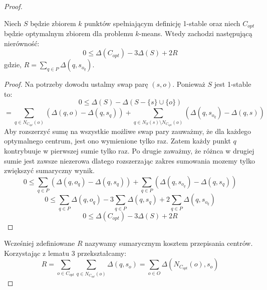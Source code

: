 \begin{proof}
    \begin{lemma}{\cite{10.1145/1007352.1007400}}
        Niech $S$ będzie zbiorem $k$ punktów spełniającym definicję 1-stable oraz niech $C_{opt}$ będzie optymalnym zbiorem dla problemu $k$-means.        Wtedy zachodzi następującą nierówność:
        \begin{equation}
            0 \leq \Delta(C_{opt}) - 3\Delta(S) + 2R
        \end{equation}
        gdzie, $R = \sum_{q \in P} \Delta(q, s_{o_{q}})$.
    \end{lemma}
    \begin{proof}
        Na potrzeby dowodu ustalmy swap parę $(s, o)$.
        Ponieważ $S$ jest 1-stable to:
        \begin{equation}
           0 \leq \Delta(S) -  \Delta(S - \{s\} \cup \{o\})
        \end{equation}
        \begin{equation}
            = \sum_{q \in N_{C_{opt}}(o)} (\Delta(q, o) - \Delta(q, s_{q})) + \sum_{q \in N_{S}(s) \setminus N_{C_{opt}}(o)} (\Delta(q, s_{o_{q}}) - \Delta(q, s))
        \end{equation}
        Aby rozszerzyć sumę na wszystkie możliwe swap pary zauważmy, że dla każdego optymalnego centrum, jest ono wymienione tylko raz.
        Zatem każdy punkt $q$ kontrybuuje w pierwszej sumie tylko raz.
        Po drugie zaważmy, że różnca w drugiej sumie jest zawsze niezerowa dlatego rozszerzając zakres sumowania mozemy tylko zwiększyć sumaryczny wynik.
        \begin{equation}
            0 \leq \sum_{q \in P} (\Delta(q, o_{q}) - \Delta(q, s_{q})) + \sum_{q \in P} (\Delta(q, s_{o_{q}}) - \Delta(q, s_{q}))
        \end{equation}
        \begin{equation}
            0 \leq \sum_{q \in P} \Delta(q, o_{q}) - 3 \sum_{q \in P} \Delta(q, s_{q}) + 2\sum_{q \in P} \Delta(q, s_{o_{q}})
        \end{equation}
        \begin{equation}
            0 \leq \Delta(C_{opt}) - 3 \Delta(S) + 2R
        \end{equation}
    \end{proof}
    \noindent
    Wcześniej zdefiniowane $R$ nazywamy sumarycznym kosztem przepisania centrów.
    Korzystając z lematu 3 przekształcamy:
    \begin{equation}
        R = \sum_{o \in C_{opt}} \sum_{q \in N_{C_{opt}}(o)} \Delta(q, s_{o}) = \sum_{o \in O} \Delta(N_{C_{opt}}(o), s_{o}) 

\end{equation}
\end{proof}
